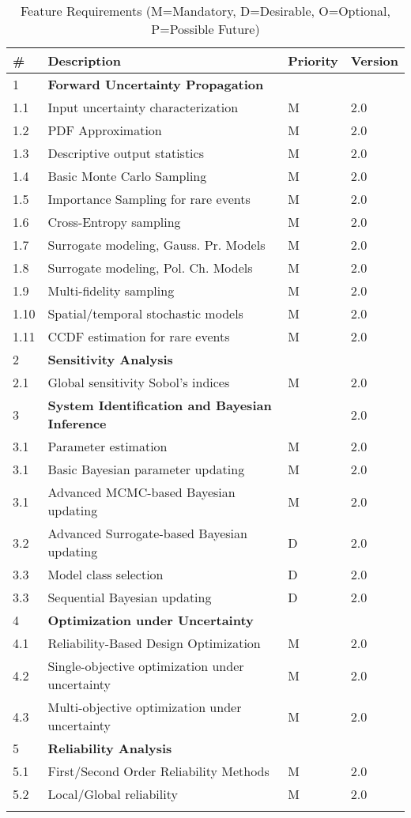 \newpage
\begin{longtable}{| p{} | p{} | p{} | p{} |}
    \toprule
      \# & Description & Priority & Version \\ \hline
      1 & \textbf{Forward Uncertainty Propagation} &  &  \\ 
	1.1 & Input uncertainty characterization & M & 2.0 \\ \hline
	1.2 & PDF Approximation & M & 2.0 \\ \hline
	1.3 &  Descriptive output statistics & M & 2.0 \\ \hline
	1.4 &  Basic Monte Carlo Sampling  & M & 2.0 \\ \hline	
	1.5 &  Importance Sampling for rare events  & M & 2.0 \\ \hline	
	1.6 &  Cross-Entropy sampling  & M & 2.0 \\ \hline
	1.7 &  Surrogate modeling, Gauss. Pr. Models  & M & 2.0 \\ \hline
	1.8 &  Surrogate modeling, Pol. Ch. Models  & M & 2.0 \\ \hline
	1.9 &  Multi-fidelity sampling  & M & 2.0 \\ \hline
	1.10 &  Spatial/temporal stochastic models  & M & 2.0 \\ \hline
	1.11 &  CCDF estimation for rare events  & M & 2.0 \\ \hline
	2 & \textbf{Sensitivity Analysis} &  &  \\ \hline
	2.1 & Global sensitivity Sobol's indices & M & 2.0  \\ \hline
	3 & \textbf{System Identification and Bayesian Inference} &  & 2.0 \\ \hline
	3.1 & Parameter estimation & M & 2.0 \\ \hline
	3.1 & Basic Bayesian parameter updating & M & 2.0 \\ \hline
	3.1 & Advanced MCMC-based Bayesian updating & M & 2.0 \\ \hline
	3.2 & Advanced Surrogate-based Bayesian updating & D & 2.0 \\ \hline
	3.3 & Model class selection & D & 2.0 \\ \hline
	3.3 & Sequential Bayesian updating & D & 2.0 \\ \hline
	4 & \textbf{Optimization under Uncertainty} &  &  \\ \hline
	4.1 & Reliability-Based Design Optimization & M & 2.0 \\ \hline
	4.2 & Single-objective optimization under uncertainty & M & 2.0 \\ \hline
	4.3 & Multi-objective optimization under uncertainty & M & 2.0 \\ \hline
	5 & \textbf{Reliability Analysis} &  &  \\ \hline
	5.1 & First/Second Order Reliability Methods & M & 2.0 \\ \hline
	5.2 & Local/Global reliability & M & 2.0 \\ \hline
	\bottomrule
\caption{Feature Requirements (M=Mandatory, D=Desirable, O=Optional, P=Possible Future)}             
  \label{tab:featureRequirements}                 
\end{longtable}
